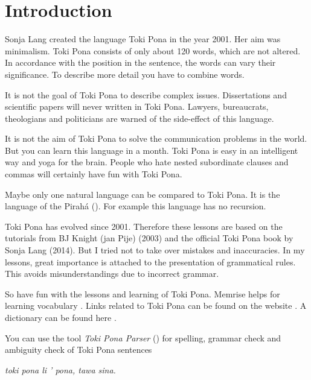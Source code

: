 \section{Introduction}
%
Sonja Lang created the language Toki Pona in the year 2001.
Her aim was minimalism.
Toki Pona consists of only about 120 words, which are not altered.
In accordance with the position in the sentence, the words can vary their significance.
To describe more detail you have to combine words.

It is not the goal of Toki Pona to describe complex issues.
Dissertations and scientific papers will never written in Toki Pona.
Lawyers, bureaucrats, theologians and politicians are warned of the side-effect of this language.

It is not the aim of Toki Pona to solve the communication problems in the world.
But you can learn this language in a month.
Toki Pona is easy in an intelligent way and yoga for the brain.
People who hate nested subordinate clauses and commas will certainly have fun with Toki Pona.

Maybe only one natural language can be compared to Toki Pona.
It is the language of the Pirah\'{a} (\cite{www:piraha:01}).
For example this language has no recursion.

%
%
Toki Pona has evolved since 2001.
Therefore these lessons are based on the tutorials from BJ Knight (jan Pije) \cite{www:Pije:01} (2003) and the official Toki Pona book \cite{www:tokipona.org} by Sonja Lang (2014).
But I tried not to take over mistakes and inaccuracies.
In my lessons, great importance is attached to the presentation of grammatical rules.
This avoids misunderstandings due to incorrect grammar.

So have fun with the lessons and learning of Toki Pona.
Memrise helps for learning vocabulary \cite{www:memrise:01}. Links related to Toki Pona can be found on the website \cite{www:rowa:01}.
A dictionary can be found here \cite{www:rowa:01}.

You can use the tool \textit{Toki Pona Parser} (\cite{www:rowa:02}) for spelling, grammar check and ambiguity check of Toki Pona sentences

\textit{toki pona li ' pona, tawa sina.}
%

